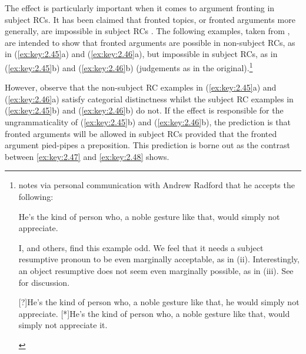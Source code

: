 \documentclass[output=paper]{langsci/langscibook}
\begin{document}
\largerpage[-5]
The  effect is particularly important when it comes to
argument fronting in subject \glspl{RC}. It has been claimed that fronted topics, or
fronted arguments more generally, are impossible in subject RCs
\parencites[58]{Haegeman2012}[307]{Rizzi1997}. The following examples, taken
from \textcite[307]{Rizzi1997}, are intended to show that fronted arguments are
possible in non-subject RCs, as in (\ref{ex:key:2.45}a) and (\ref{ex:key:2.46}a), but impossible in subject
RCs, as in (\ref{ex:key:2.45}b) and (\ref{ex:key:2.46}b) (judgements as in the
original).\footnote{\textcite[Ch.\ 2, note 6]{Haegeman2012} notes via personal
    communication with Andrew Radford that he accepts the following:

    \begin{exe}
          He’s the kind of person who, a noble gesture like that, would simply not appreciate.
    \end{exe}
    I, and others, find this example odd. We feel that it needs a subject
    resumptive pronoun to be even marginally acceptable, as in (ii).
    Interestingly, an object resumptive does not seem even marginally possible,
    as in (iii). See  for discussion.

    \begin{exe}
        [?]{He’s the kind of person who, a noble gesture like that, he would simply not appreciate.}
        [*]{He’s the kind of person who, a noble gesture like that, would simply not appreciate it.}
\end{exe}\label{fn:02.5}}

\ea\label{ex:key:2.45}
    \z
\z
\ea\label{ex:key:2.46}
    \z
\z
{}
%
However, observe that the non-subject \gls{RC} examples in (\ref{ex:key:2.45}a) and (\ref{ex:key:2.46}a) satisfy
categorial distinctness whilst the subject \gls{RC} examples in (\ref{ex:key:2.45}b) and (\ref{ex:key:2.46}b) do
not. If the  effect is responsible for the
ungrammaticality of (\ref{ex:key:2.45}b) and (\ref{ex:key:2.46}b), the prediction is that fronted arguments
will be allowed in subject \glspl{RC} provided that the fronted argument pied-pipes a
preposition. This prediction is borne out as the contrast between \eqref{ex:key:2.47} and \eqref{ex:key:2.48}
shows.
\end{document}
